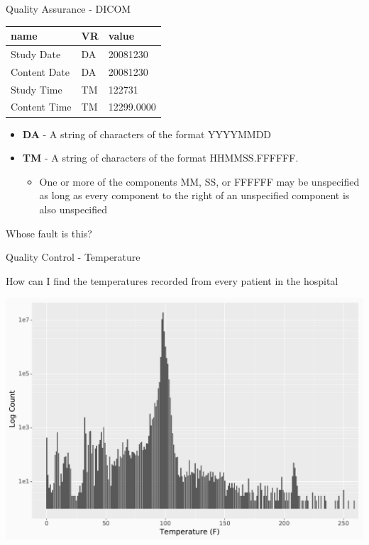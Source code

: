 \documentclass[10pt, xcolor=table]{beamer}
\begin{document}
\begin{frame}{Quality Assurance - DICOM}
\begin{center}
\begin{tabular}{lll}
\toprule
                        name &  VR &                                              value \\
\midrule
                  Study Date &  DA &                                           20081230 \\
                Content Date &  DA &                                           20081230 \\
                  Study Time &  TM &                                             122731 \\
                Content Time &  TM &                                         12299.0000 \\
\bottomrule
\end{tabular}
\end{center}
	\begin{itemize}
		\item \textbf{DA} - A string of characters of the format YYYYMMDD
		\item \textbf{TM} - A string of characters of the format HHMMSS.FFFFFF.  
		\begin{itemize}
			\item One or more of the components MM, SS, or FFFFFF may be unspecified as long as every component to the right of an unspecified component is also unspecified
		\end{itemize}		 
	\end{itemize}

	\begin{center}
		\large{Whose fault is this?}
	\end{center}
\end{frame}

\begin{frame}{Quality Control - Temperature}
	\begin{center}
		\LARGE{How can I find the temperatures recorded from every patient in the hospital}
	\end{center}
\end{frame}


\begin{frame}
	\includegraphics[width=\textwidth]{images/temp_value_counts.pdf}
\end{frame}
\end{document}
